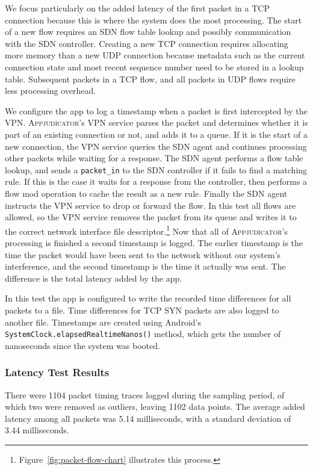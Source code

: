 We focus particularly on the added latency of the first packet in a TCP
connection because this is where the system does the most processing. The start
of a new flow requires an SDN flow table lookup and possibly communication with
the SDN controller. Creating a new TCP connection requires allocating more
memory than a new UDP connection because metadata such as the current connection
state and most recent sequence number need to be stored in a lookup table.
Subsequent packets in a TCP flow, and all packets in UDP flows require less
processing overhead.

We configure the app to log a timestamp when a packet is first intercepted by
the VPN. \textsc{Appjudicator}'s VPN service parses the packet and determines
whether it is part of an existing connection or not, and adds it to a queue. If
it is the start of a new connection, the VPN service queries the SDN agent and
continues processing other packets while waiting for a response. The SDN agent
performs a flow table lookup, and sends a \texttt{packet\_in} to the SDN
controller if it fails to find a matching rule. If this is the case it waits for
a response from the controller, then performs a flow mod operation to cache the
result as a new rule. Finally the SDN agent instructs the VPN service to drop or
forward the flow. In this test all flows are allowed, so the VPN service removes
the packet from its queue and writes it to the correct network interface file
descriptor.\footnote{Figure~\ref{fig:packet-flow-chart} illustrates this
process.} Now that all of \textsc{Appjudicator}'s processing is finished a
second timestamp is logged. The earlier timestamp is the time the packet would
have been sent to the network without our system's interference, and the second
timestamp is the time it actually was sent. The difference is the total latency
added by the app.

In this test the app is configured to write the recorded time differences for
all packets to a file. Time differences for TCP SYN packets are also logged to
another file. Timestamps are created using Android's
\texttt{SystemClock.elapsedRealtimeNanos()} method, which gets the number of
nanoseconds since the system was booted.~\cite{androidsystemclock}

\subsubsection{Latency Test Results}
\label{sec:latency-test-results}

There were 1104 packet timing traces logged during the sampling period, of which
two were removed as outliers, leaving 1102 data points. The average added
latency among all packets was 5.14 milliseconds, with a standard deviation of
3.44 milliseconds.

